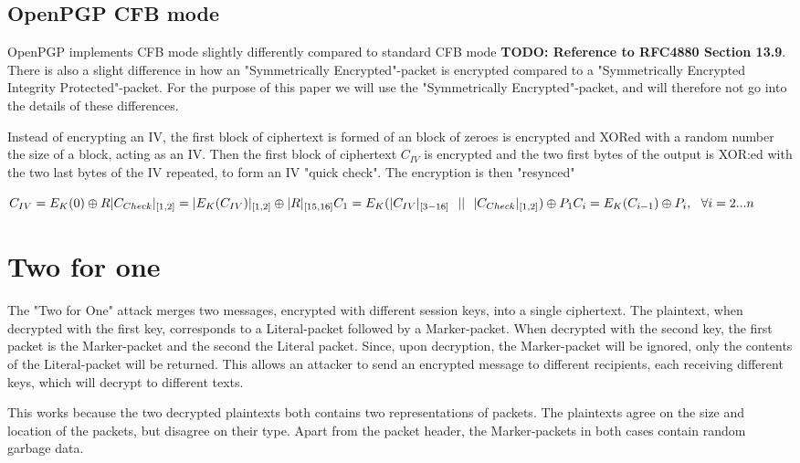\documentclass[runningheads,a4paper]{llncs}[2018/03/10]
\newcommand{\todo}[1]{\textbf{\color{blue}TODO: #1}}
\begin{document}
\subsection{OpenPGP CFB mode}

OpenPGP implements CFB mode slightly differently compared to standard 
CFB mode \todo{Reference to RFC4880 Section 13.9}. There is also a slight difference in how an "Symmetrically 
Encrypted"-packet is encrypted compared to a "Symmetrically Encrypted Integrity 
Protected"-packet. For the purpose of this paper we will use the "Symmetrically 
Encrypted"-packet, and will therefore not go into the details of these 
differences.


Instead of encrypting an IV, the first block of ciphertext is formed of an block of zeroes is encrypted and XORed with a random 
number the size of a block, acting as an IV. Then the first block of ciphertext $C_{IV}$ is encrypted and the two first bytes of the output is XOR:ed with the two last bytes of the IV repeated, to form an IV "quick check". The encryption is then "resynced"

$
\\
C_{IV} = E_K(0) \oplus R \\
|C_{Check}|_{[1,2]} = |E_K(C_{IV})|_{[1,2]} \oplus |R|_{[15,16]} \\
C_1 = E_K(|C_{IV}|_{[3-16]}~~||~~|C_{Check}|_{[1,2]}) \oplus P_1 \\
C_i = E_K(C_{i-1}) \oplus P_i,~~\forall i = 2 ... n
$


\section{Two for one}\label{sec:twoforone}

The "Two for One" attack merges two messages, encrypted with different session 
keys, 
into a single ciphertext. The plaintext, when decrypted with the first key, 
corresponds to a Literal-packet followed by a Marker-packet. When decrypted with 
the second 
key, the first packet is the Marker-packet and the second the Literal packet. 
Since, upon decryption, the Marker-packet will be ignored, only the contents of 
the Literal-packet will be returned. This allows an attacker to send an 
encrypted message to different recipients, each receiving different keys, which 
will decrypt to different texts.



This works because the two decrypted plaintexts both contains two representations 
of packets. The plaintexts agree on the size and location of the packets, but 
disagree on their type. Apart 
from the packet header, the Marker-packets in both cases contain random garbage 
data. 
\end{document}
